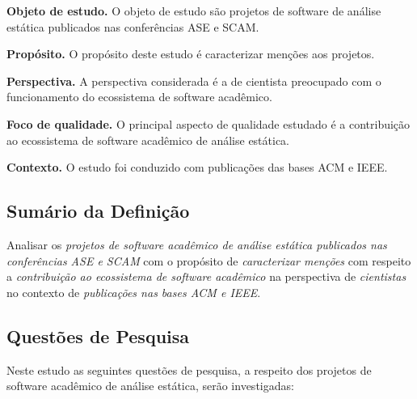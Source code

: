 \begin{description}
\item{\bf Objeto de estudo.} 
O objeto de estudo são projetos de software de análise estática publicados nas conferências ASE e SCAM.

\item{\bf Propósito.} 
O propósito deste estudo é caracterizar menções aos projetos.

\item{\bf Perspectiva.} 
A perspectiva considerada é a de cientista preocupado com o funcionamento do ecossistema de software acadêmico.

\item{\bf Foco de qualidade.} 
O principal aspecto de qualidade estudado é a contribuição ao ecossistema de software acadêmico de análise estática.

\item{\bf Contexto.} 
O estudo foi conduzido com publicações das bases ACM e IEEE.
\end{description}

\subsection{Sumário da Definição}

Analisar os \textit{projetos de software acadêmico de análise estática publicados nas conferências ASE e SCAM}
com o propósito de \textit{caracterizar menções}
com respeito a \textit{contribuição ao ecossistema de software acadêmico}
na perspectiva de \textit{cientistas}
no contexto de \textit{publicações nas bases ACM e IEEE}.

\subsection{Questões de Pesquisa}

Neste estudo as seguintes questões de pesquisa, a respeito dos projetos de
software acadêmico de análise estática, serão investigadas:

\newcommand{\EstudoDoisQuestaoUm}{
  Como os projetos de software acadêmico de análise estática publicados nas
  conferências ASE e SCAM são mencionados em publicações nas bases ACM e IEEE?
}
\newcommand{\EstudoDoisQuestaoDois}{
   Os projetos de software acadêmico de análise estática publicados nas
   conferências ASE e SCAM são utilizados em publicações nas bases ACM e IEEE?
}
\newcommand{\EstudoDoisQuestaoTres}{
  Os projetos de software acadêmico de análise estática publicados nas
  conferências ASE e SCAM recebem contribuições de código fonte em publicações
  nas bases ACM e IEEE?
}

